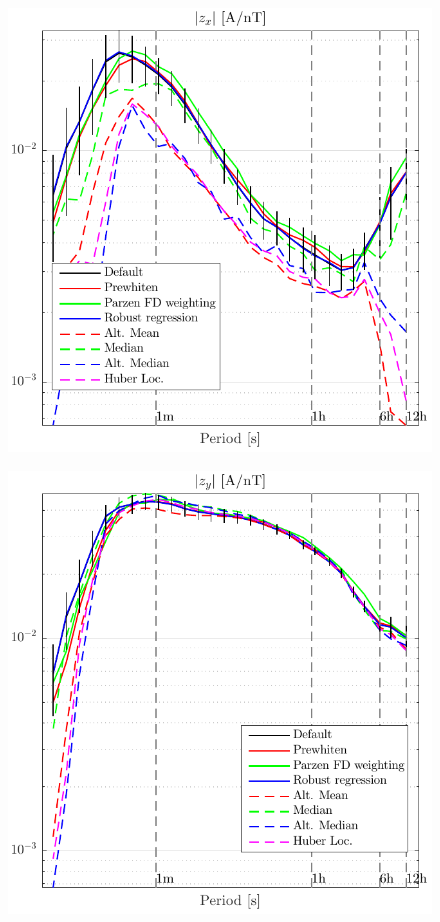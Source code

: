 \documentclass[draft,linenumbers]{agujournal2018}
\begin{document}
\begin{figure}[h]
\begin{minipage}[t]{.48\linewidth}
\end{minipage}
\begin{minipage}[t]{.48\linewidth}
\includegraphics[width=\textwidth]{figures/plot_options_comparison_zx.pdf}
\label{plot_options_comparison_a}
\end{minipage}
\begin{minipage}[t]{.48\linewidth}
\includegraphics[width=\textwidth]{figures/plot_options_comparison_zy.pdf}
\end{minipage}

\end{figure}
\end{document}
